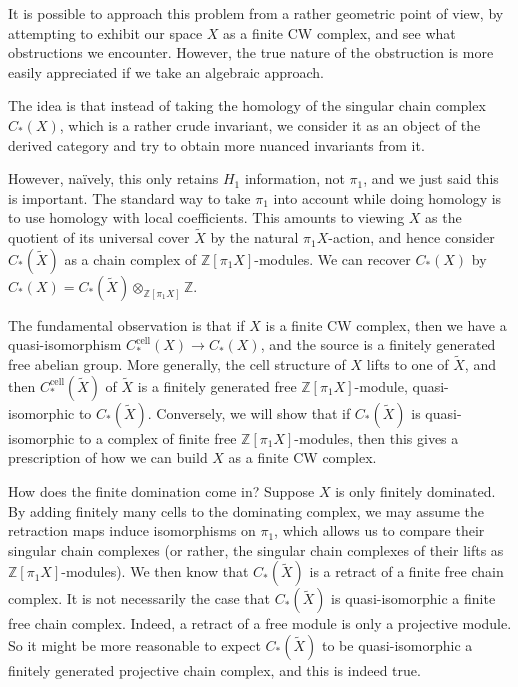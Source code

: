 \documentclass[a4paper, 12pt]{article}
\theoremstyle{definition}
\newcommand\Z{\mathbb{Z}}
\newcommand\cell{\mathrm{cell}}
\begin{document}
It is possible to approach this problem from a rather geometric point of view, by attempting to exhibit our space $X$ as a finite CW complex, and see what obstructions we encounter. However, the true nature of the obstruction is more easily appreciated if we take an algebraic approach.

The idea is that instead of taking the homology of the singular chain complex $C_*(X)$, which is a rather crude invariant, we consider it as an object of the derived category and try to obtain more nuanced invariants from it.

However, na\"ively, this only retains $H_1$ information, not $\pi_1$, and we just said this is important. The standard way to take $\pi_1$ into account while doing homology is to use homology with local coefficients. This amounts to viewing $X$ as the quotient of its universal cover $\tilde{X}$ by the natural $\pi_1 X$-action, and hence consider $C_*(\tilde{X})$ as a chain complex of $\Z[\pi_1 X]$-modules. We can recover $C_*(X)$ by $C_*(X) = C_*(\tilde{X}) \otimes_{\Z[\pi_1 X]} \Z$.

The fundamental observation is that if $X$ is a finite CW complex, then we have a quasi-isomorphism $C^{\cell}_*(X) \to C_*(X)$, and the source is a finitely generated free abelian group. More generally, the cell structure of $X$ lifts to one of $\tilde{X}$, and then $C^{\cell}_*(\tilde{X})$ of $\tilde{X}$ is a finitely generated free $\Z[\pi_1 X]$-module, quasi-isomorphic to $C_*(\tilde{X})$. Conversely, we will show that if $C_*(\tilde{X})$ is quasi-isomorphic to a complex of finite free $\Z[\pi_1 X]$-modules, then this gives a prescription of how we can build $X$ as a finite CW complex.

How does the finite domination come in? Suppose $X$ is only finitely dominated. By adding finitely many cells to the dominating complex, we may assume the retraction maps induce isomorphisms on $\pi_1$, which allows us to compare their singular chain complexes (or rather, the singular chain complexes of their lifts as $\Z[\pi_1 X]$-modules). We then know that $C_*(\tilde{X})$ is a retract of a finite free chain complex. It is not necessarily the case that $C_*(\tilde{X})$ is quasi-isomorphic a finite free chain complex. Indeed, a retract of a free module is only a projective module. So it might be more reasonable to expect $C_*(\tilde{X})$ to be quasi-isomorphic a finitely generated projective chain complex, and this is indeed true.
\end{document}
